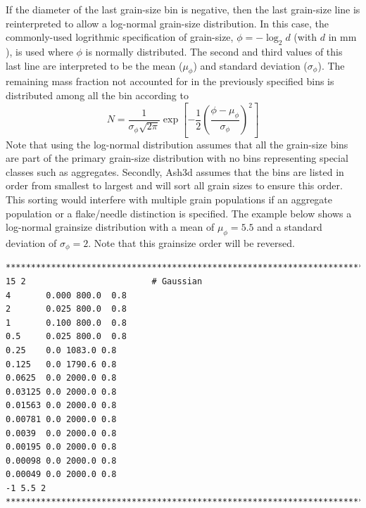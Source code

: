 If the diameter of the last grain-size bin is negative, then the last grain-size line
is reinterpreted to allow a log-normal grain-size distribution.
In this case, the commonly-used logrithmic specification of grain-size,
$\phi=-\log_2 d$ (with $d$ in $\mathrm{mm}$), is used where $\phi$ is normally
distributed.
The second and third values of this last line
are interpreted to be the mean ($\mu_{\phi}$)
and standard deviation ($\sigma_{\phi}$).
The remaining mass fraction not accounted for in the previously specified
bins is distributed among all the bin according to 
\begin{equation}
N=\frac{1}{\sigma_{\phi} \sqrt{2 \pi}}
\exp{\left[-\frac{1}{2} \left(  \frac{\phi-\mu_{\phi}}{\sigma_{\phi}}  \right)^2 \right]}
\end{equation}
Note that using the log-normal distribution assumes that all the grain-size bins
are part of the primary grain-size distribution with no bins representing special
classes such as aggregates.  Secondly, Ash3d assumes that the bins are listed in
order from smallest to largest and will sort all grain sizes to ensure this order.
This sorting would interfere with multiple grain populations if an aggregate
population or a flake/needle distinction is specified.  The example below shows
a log-normal grainsize distribution with a mean of $\mu_{\phi}=5.5$ and a standard
deviation of $\sigma_{\phi}=2$.  Note that this grainsize order will be reversed.
\small
\begin{verbatim}
*******************************************************************************
15 2                         # Gaussian
4       0.000 800.0  0.8
2       0.025 800.0  0.8
1       0.100 800.0  0.8
0.5     0.025 800.0  0.8
0.25    0.0 1083.0 0.8
0.125   0.0 1790.6 0.8
0.0625  0.0 2000.0 0.8
0.03125 0.0 2000.0 0.8
0.01563 0.0 2000.0 0.8
0.00781 0.0 2000.0 0.8
0.0039  0.0 2000.0 0.8
0.00195 0.0 2000.0 0.8
0.00098 0.0 2000.0 0.8
0.00049 0.0 2000.0 0.8
-1 5.5 2
*******************************************************************************
\end{verbatim}
\normalsize

